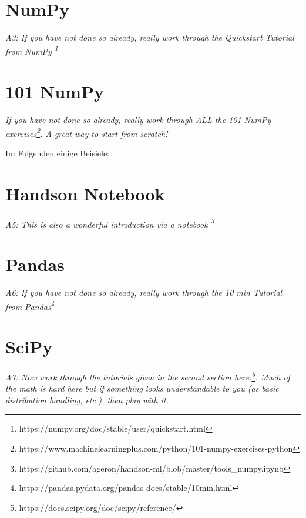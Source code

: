 \documentclass[11pt,a4paper]{article}
\begin{document}
\section{NumPy}
\textit{A3: If you have not done so already, really work through the Quickstart Tutorial from NumPy \footnote{https://numpy.org/doc/stable/user/quickstart.html}}



\section{101 NumPy}
\textit{If you have not done so already, really work through ALL the 101 NumPy exercises\footnote{https://www.machinelearningplus.com/python/101-numpy-exercises-python}. A great way to start from scratch!}

Im Folgenden einige Beisiele:



\section{Handson Notebook}
\textit{A5: This is also a wonderful introduction via a notebook \footnote{https://github.com/ageron/handson-ml/blob/master/tools\_numpy.ipynb}}

\section{Pandas}
\textit{A6: If you have not done so already, really work through the 10 min Tutorial from Pandas\footnote{https://pandas.pydata.org/pandas-docs/stable/10min.html}}

\section{SciPy}
\textit{A7: Now work through the tutorials given in the second section here:\footnote{https://docs.scipy.org/doc/scipy/reference/}. Much of the math is hard here but if something looks understandable to you (as basic distribution handling, etc.), then play with it.}
\end{document}
